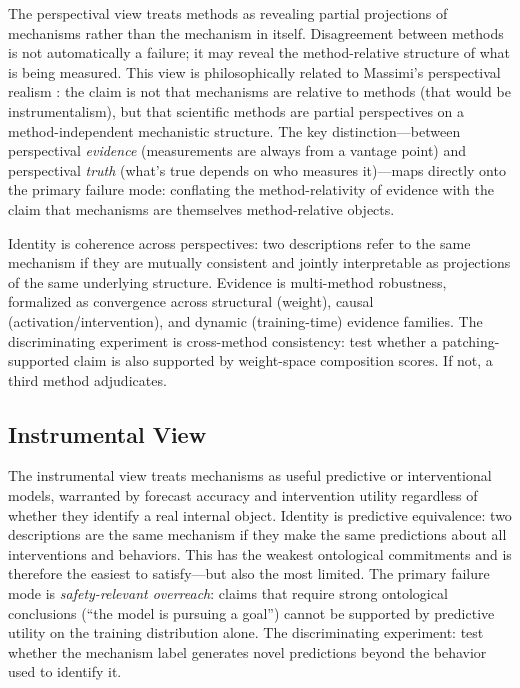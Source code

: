 \documentclass{article}
\begin{document}
The perspectival view treats methods as revealing partial projections of
mechanisms rather than the mechanism in itself.  Disagreement between
methods is not automatically a failure; it may reveal the method-relative
structure of what is being measured.  This view is philosophically related
to Massimi's perspectival realism \citep{massimi2022}: the claim is not
that mechanisms are relative to methods (that would be instrumentalism),
but that scientific methods are partial perspectives on a
method-independent mechanistic structure.  The key distinction---between
perspectival \emph{evidence} (measurements are always from a vantage
point) and perspectival \emph{truth} (what's true depends on who measures
it)---maps directly onto the primary failure mode: conflating the
method-relativity of evidence with the claim that mechanisms are
themselves method-relative objects.

Identity is coherence across perspectives: two descriptions refer to the
same mechanism if they are mutually consistent and jointly interpretable
as projections of the same underlying structure.  Evidence is
multi-method robustness, formalized as
convergence across structural (weight), causal (activation/intervention),
and dynamic (training-time) evidence families.  The discriminating
experiment is cross-method consistency: test whether a patching-supported
claim is also supported by weight-space composition scores.  If not,
a third method adjudicates.

\subsection{Instrumental View}

The instrumental view treats mechanisms as useful predictive or
interventional models, warranted by forecast accuracy and intervention
utility regardless of whether they identify a real internal object.
Identity is predictive equivalence: two descriptions are the same
mechanism if they make the same predictions about all interventions and
behaviors.  This has the weakest ontological commitments and is therefore
the easiest to satisfy---but also the most limited.  The primary failure
mode is \emph{safety-relevant overreach}: claims that require strong
ontological conclusions (``the model is pursuing a goal'') cannot be
supported by predictive utility on the training distribution alone.
The discriminating experiment: test whether the mechanism label generates
novel predictions beyond the behavior used to identify it.
\end{document}
